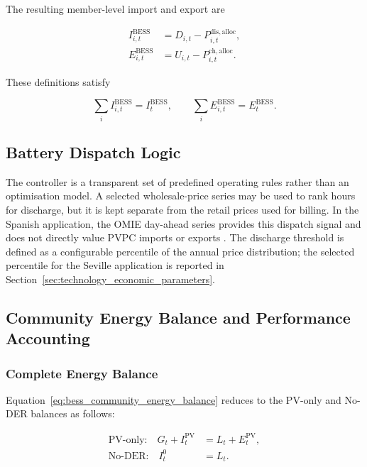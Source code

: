 The resulting member-level import and export are

\begin{align}
I^{\mathrm{BESS}}_{i,t} &= D_{i,t}-P^{\mathrm{dis,alloc}}_{i,t},\label{eq:bess_import_member}\\
E^{\mathrm{BESS}}_{i,t} &= U_{i,t}-P^{\mathrm{ch,alloc}}_{i,t}.\label{eq:bess_export_member}
\end{align}

These definitions satisfy

\begin{equation}
\label{eq:member_flow_closure}
\sum_i I^{\mathrm{BESS}}_{i,t}=I^{\mathrm{BESS}}_t,
\qquad
\sum_i E^{\mathrm{BESS}}_{i,t}=E^{\mathrm{BESS}}_t.
\end{equation}

\subsection{Battery Dispatch Logic}
\label{sec:battery_dispatch_logic}

The controller is a transparent set of predefined operating rules rather than an optimisation model. A selected wholesale-price series may be used to rank hours for discharge, but it is kept separate from the retail prices used for billing. In the Spanish application, the OMIE day-ahead series provides this dispatch signal and does not directly value PVPC imports or exports \cite{omie2025omie}. The discharge threshold is defined as a configurable percentile of the annual price distribution; the selected percentile for the Seville application is reported in Section~\ref{sec:technology_economic_parameters}.

\subsection{Community Energy Balance and Performance Accounting}
\label{sec:community_energy_balance_validation}

\subsubsection{Complete Energy Balance}
\label{subsec:complete_energy_balance}

Equation~\eqref{eq:bess_community_energy_balance} reduces to the PV-only and No-DER balances as follows:

\begin{align}
\text{PV-only:}\quad G_t+I^{\mathrm{PV}}_t &= L_t+E^{\mathrm{PV}}_t,\label{eq:pv_only_balance_reduction}\\
\text{No-DER:}\quad I^0_t &= L_t.\label{eq:no_der_balance_reduction}
\end{align}

